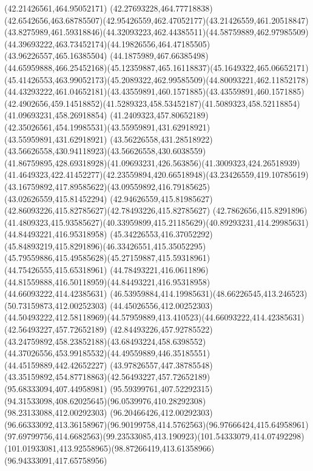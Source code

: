 {{\lineto(42.21426561,464.95052171)
\lineto(42.27693228,464.77718838)
\curveto(42.6542656,463.68785507)(42.95426559,462.47052177)(43.21426559,461.20518847)
\curveto(43.8275989,461.59318846)(44.32093223,462.44385511)(44.58759889,462.97985509)
\curveto(44.39693222,463.73452174)(44.19826556,464.47185505)(43.96226557,465.16385504)
\lineto(44.1875989,467.66385498)
\curveto(44.65959888,466.25452168)(45.12359887,465.16118837)(45.1649322,465.06652171)
\curveto(45.41426553,463.99052173)(45.2089322,462.99585509)(44.80093221,462.11852178)
\curveto(44.43293222,461.04652181)(43.43559891,460.1571885)(43.43559891,460.1571885)
\curveto(42.4902656,459.14518852)(41.5289323,458.53452187)(41.5089323,458.52118854)
\lineto(41.09693231,458.26918854)
\lineto(41.2409323,457.80652189)
\curveto(42.35026561,454.19985531)(43.55959891,431.62918921)(43.55959891,431.62918921)
\curveto(43.56226558,431.28518922)(43.56626558,430.94118923)(43.56626558,430.6038559)
\curveto(41.86759895,428.69318928)(41.09693231,426.563856)(41.3009323,424.26518939)
\curveto(41.4649323,422.41452277)(42.23559894,420.66518948)(43.23426559,419.10785619)
\curveto(43.16759892,417.89585622)(43.09559892,416.79185625)(43.02626559,415.81452294)
\curveto(42.94626559,415.81985627)(42.86093226,415.82785627)(42.78493226,415.82785627)
\lineto(42.7862656,415.8291896)
\curveto(41.4809323,415.93585627)(40.33959899,415.21185629)(40.89293231,414.29985631)
\moveto(44.84493221,416.95318958)
\curveto(45.34226553,416.37052292)(45.84893219,415.8291896)(46.33426551,415.35052295)
\curveto(45.79559886,415.49585628)(45.27159887,415.59318961)(44.75426555,415.65318961)
\curveto(44.78493221,416.0611896)(44.81559888,416.50118959)(44.84493221,416.95318958)
\moveto(44.66093222,414.42385631)
\curveto(46.53959884,414.19985631)(48.66226545,413.246523)(50.73159873,412.00252303)
\lineto(44.45026556,412.00252303)
\curveto(44.50493222,412.58118969)(44.57959889,413.410523)(44.66093222,414.42385631)
\moveto(42.56493227,457.72652189)
\curveto(42.84493226,457.92785522)(43.24759892,458.23852188)(43.68493224,458.6398552)
\curveto(44.37026556,453.99185532)(44.49559889,446.35185551)(44.45159889,442.42652227)
\curveto(43.97826557,447.38785548)(43.35159892,454.87718863)(42.56493227,457.72652189)
\moveto(95.68333094,407.44958981)
\curveto(95.59399761,407.52292315)(94.31533098,408.62025645)(96.0539976,410.28292308)
\lineto(98.23133088,412.00292303)
\lineto(96.20466426,412.00292303)
\curveto(96.66333092,413.36158967)(96.90199758,414.5762563)(96.97666424,415.64958961)
\curveto(97.69799756,414.6682563)(99.23533085,413.190923)(101.54333079,414.07492298)
\curveto(101.01933081,413.92558965)(98.87266419,413.61358966)(96.94333091,417.65758956)
}}
